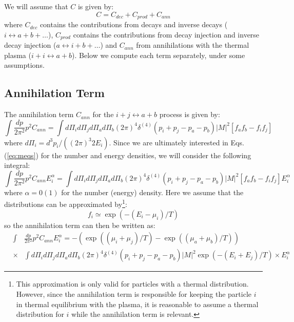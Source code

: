 \documentclass[preprint,notoc]{JHEP3}
\begin{document}
We will assume that $C$ is given by:
\begin{equation}
C = C_{dec} + C_{prod} + C_{ann} 
\end{equation}
where $C_{dec}$ contains the contributions from decays and inverse decays
($i \leftrightarrow a + b + \ldots$), $C_{prod}$ contains the
contributions from decay injection and inverse decay injection 
($a \leftrightarrow i + b + \ldots$) and $C_{ann}$ from
annihilations with the thermal plasma ($i + i \leftrightarrow a + b$).
Below we compute each term separately, under some assumptions.

\subsection{Annihilation Term}

The annihilation term $C_{ann}$ for the $i + j \leftrightarrow a + b$ process is
given by\cite{turner}:
\begin{equation}
\int \frac{dp}{2 \pi^2} p^2 C_{ann} = \int d\Pi_{i} d\Pi_{j} d\Pi_{a}
d\Pi_{b} (2 \pi)^4 \delta^{(4)}(p_i + p_j - p_a - p_b) |M|^2 \left[ f_a f_b -
f_i f_j \right]
\end{equation}
where $d\Pi_{i} = d^{3} p_i/((2\pi)^3 2 E_i)$. Since we are ultimately interested in Eqs.(\ref{eq:meqs}) for the number and energy densities, we will
consider the following integral:
\begin{equation}
\int \frac{dp}{2 \pi^2} p^2 C_{ann}  E_i^{\alpha} = \int d\Pi_{i} d\Pi_{j} d\Pi_{a} d\Pi_{b} (2 \pi)^4 
\delta^{(4)}(p_i + p_j - p_a - p_b) |M|^2
 \left[ f_a f_b - f_i f_j \right] E_i^{\alpha}
\end{equation}
where $\alpha = 0 (1)$ for the number (energy) density. Here we assume that the
distributions can be approximated by\footnote{This approximation is only valid for 
particles with a thermal distribution. However, since the annihilation term
is responsible for keeping the particle $i$ in thermal equilibrium with the plasma, 
it is reasonable to assume a thermal distribution for $i$
while the annihilation term is relevant.}:
\begin{equation}
f_i \simeq \exp(-(E_i - \mu_i)/T)
\end{equation}
so the annihilation term can then be written as:
\begin{eqnarray}
& \int & \frac{dp}{2 \pi^2} p^2 C_{ann}  E_i^{\alpha} =  -\left( \exp((\mu_i + \mu_j)/T) -\exp((\mu_a + \mu_b)/T)\right) \nonumber \\
 & \times & \int  d\Pi_{i} d\Pi_{j} d\Pi_{a} d\Pi_{b} (2 \pi)^4 \delta^{(4)}(p_i + p_j - p_a - p_b) |M|^2 \exp(-(E_i + E_j)/T) \times E_i^{\alpha} \nonumber
\end{eqnarray}
\end{document}

